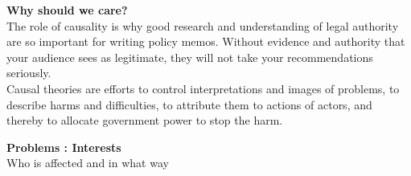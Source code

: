 \documentclass[aspectratio=169]{beamer}
\theoremstyle{principle}
\begin{document}

\begin{frame}

\begin{center}
\Huge\textbf{Why should we care?}\\
\bigskip
\bigskip
\large The role of causality is why good research and understanding of legal authority are so important for writing policy memos. Without evidence and authority that your audience sees as legitimate, they will not take your recommendations seriously.\\
\bigskip
Causal theories are efforts to control interpretations and images of problems, to describe harms and difficulties, to attribute them to actions of actors, and thereby to allocate government power to stop the harm.
\\
\end{center}

\end{frame}

\begin{frame}

\begin{center}
\Huge\textbf{Problems : Interests}\\
\bigskip
\bigskip
\large Who is affected and in what way
\end{center}

\end{frame}
\end{document}

